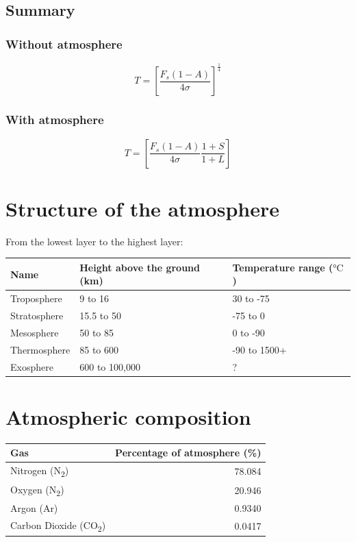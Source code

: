 \documentclass[11pt]{article}
\begin{document}
\subsection{Summary}
\label{sec:org6811e68}

\subsubsection{Without atmosphere}
\label{sec:orge80354e}
\[T = \left[\frac{F_s(1-A)}{4 \sigma} \right]^{\frac{1}{4}}\]
\subsubsection{With atmosphere}
\label{sec:org03eeeda}
\[T = \left[\frac{F_s(1-A)}{4 \sigma} \frac{1+S}{1+L} \right]\]
\section{Structure of the atmosphere}
\label{sec:org2b214a1}
From the lowest layer to the highest layer:
\begin{center}
\begin{tabular}{l|l|l}
Name & Height above the ground (km) & Temperature range (\(\unit{\degreeCelsius}\))\\
\hline
Troposphere & 9 to 16 & 30 to -75\\
Stratosphere & 15.5 to 50 & -75 to 0\\
Mesosphere & 50 to 85 & 0 to -90\\
Thermosphere & 85 to 600 & -90 to 1500+\\
Exosphere & 600 to 100,000 & ?\\
\end{tabular}
\end{center}

\newpage
\section{Atmospheric composition}
\label{sec:org7fe1c14}
\begin{center}
\begin{tabular}{l|r}
Gas & Percentage of atmosphere (\%)\\
\hline
Nitrogen (N\textsubscript{2}) & 78.084\\
Oxygen (N\textsubscript{2}) & 20.946\\
Argon (Ar) & 0.9340\\
Carbon Dioxide (CO\textsubscript{2}) & 0.0417\\
\end{tabular}
\end{center}
\end{document}
